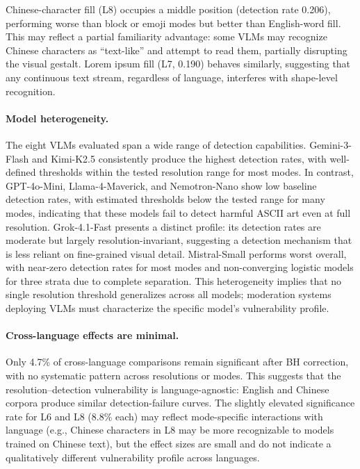 \documentclass[11pt]{article}
\begin{document}
Chinese-character fill (L8) occupies a middle position (detection rate 0.206), performing worse
than block or emoji modes but better than English-word fill. This may reflect a partial
familiarity advantage: some VLMs may recognize Chinese characters as ``text-like'' and attempt
to read them, partially disrupting the visual gestalt. Lorem ipsum fill (L7, 0.190) behaves
similarly, suggesting that any continuous text stream, regardless of language, interferes with
shape-level recognition.

\paragraph{Model heterogeneity.}
The eight VLMs evaluated span a wide range of detection capabilities. Gemini-3-Flash and Kimi-K2.5
consistently produce the highest detection rates, with well-defined thresholds within the tested
resolution range for most modes. In contrast, GPT-4o-Mini, Llama-4-Maverick, and Nemotron-Nano
show low baseline detection rates, with estimated thresholds below the tested range for many modes,
indicating that these models fail to detect harmful ASCII art even at full resolution. Grok-4.1-Fast
presents a distinct profile: its detection rates are moderate but largely resolution-invariant,
suggesting a detection mechanism that is less reliant on fine-grained visual detail.
Mistral-Small performs worst overall, with near-zero detection rates for most modes and
non-converging logistic models for three strata due to complete separation. This heterogeneity
implies that no single resolution threshold generalizes across all models; moderation systems
deploying VLMs must characterize the specific model's vulnerability profile.

\paragraph{Cross-language effects are minimal.}
Only 4.7\% of cross-language comparisons remain significant after BH correction, with no
systematic pattern across resolutions or modes. This suggests that the resolution--detection
vulnerability is language-agnostic: English and Chinese corpora produce similar detection-failure
curves. The slightly elevated significance rate for L6 and L8 (8.8\% each) may reflect
mode-specific interactions with language (e.g., Chinese characters in L8 may be more recognizable
to models trained on Chinese text), but the effect sizes are small and do not indicate a
qualitatively different vulnerability profile across languages.
\end{document}
